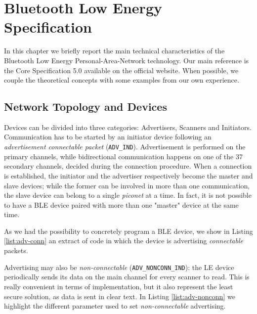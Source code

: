 \chapter{Bluetooth Low Energy Specification}
\label{chapter2}
\thispagestyle{empty}

\noindent In this chapter we briefly report the main technical characteristics of the Bluetooth Low Energy Personal-Area-Network technology. Our main reference is the Core Specification 5.0 available on the official website. When possible, we couple the theoretical concepts with some examples from our own experience.

\section{Network Topology and Devices}
Devices can be divided into three categories: Advertisers, Scanners and Initiators. 
Communication has to be started by an initiator device following an \textit{advertisement connectable packet} (\texttt{ADV\_IND}). Advertisement is performed on the primary channels, while bidirectional communication happens on one of the 37 secondary channels, decided during the connection procedure. When a connection is established, the initiator and the advertiser respectively become the master and slave devices; while the former can be involved in more than one communication, the slave device can belong to a single \textit{piconet} at a time. In fact, it is not possible to have a BLE device paired with more than one "master" device at the same time.

As we had the possibility to concretely program a BLE device, we show in Listing \ref{list:adv-conn} an extract of code in which the device is advertising \textit{connectable} packets.


Advertising may also be \textit{non-connectable} (\texttt{ADV\_NONCONN\_IND}): the LE device periodically sends its data on the main channel for every scanner to read. This is really convenient in terms of implementation, but it also represent the least secure solution, as data is sent in clear text. In Listing \ref{list:adv-nonconn} we highlight the different parameter used to set \textit{non-connectable} advertising.


